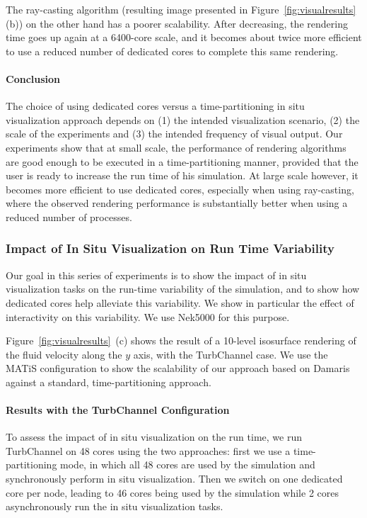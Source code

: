 The ray-casting algorithm (resulting image presented in Figure~\ref{fig:visualresults} (b))
on the other hand has a poorer scalability. After 
decreasing, the rendering time goes up again at a 6400-core scale, and it 
becomes about twice more efficient to use a reduced number of dedicated 
cores to complete this same rendering.

\paragraph{Conclusion} The choice of using dedicated cores versus a time-partitioning in situ visualization approach 
depends on (1) the intended visualization scenario, (2) the scale of the experiments and 
(3) the intended frequency of visual output. Our experiments show that at small scale,
the performance of rendering algorithms are good enough to be executed in a time-partitioning manner,
provided that the user is ready to increase the run time of his simulation. At large scale however,
it becomes more efficient to use dedicated cores, especially when using ray-casting,
where the observed rendering performance is substantially better when using a reduced number of
processes.

\subsubsection{Impact of In Situ Visualization on Run Time Variability}

Our goal in this series of experiments is to show the impact of in situ visualization
tasks on the run-time variability of the simulation, and to show how dedicated cores
help alleviate this variability. We show in particular the effect of 
interactivity on this variability. We use Nek5000 for this purpose.
 
Figure~\ref{fig:visualresults}~(c) shows the result of a 10-level 
isosurface rendering of the fluid velocity along the $y$ axis, with the 
TurbChannel case. We use the MATiS configuration to show the scalability of our 
approach based on Damaris against a standard, time-partitioning approach.

\paragraph{Results with the TurbChannel Configuration}
To assess the impact of in situ visualization on the run time, we run 
TurbChannel on 48 cores using the two approaches: first we use a 
time-partitioning mode, in which all 48 cores are used by the simulation and 
synchronously perform in situ visualization. Then we switch on one dedicated core per node,
leading to 46 cores being used by the simulation while 2 cores asynchronously run 
the in situ visualization tasks.

